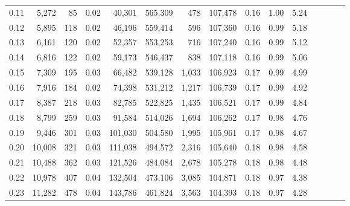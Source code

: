 \begin{tabular}{rrrcrrrrrrrrrrr}
0.11 &   5,272 &     85 &                                       0.02 &   40,301 &  565,309 &      478 &  107,478 &  0.16 &  1.00 &                         5.24 \\
0.12 &   5,895 &    118 &                                       0.02 &   46,196 &  559,414 &      596 &  107,360 &  0.16 &  0.99 &                         5.18 \\
0.13 &   6,161 &    120 &                                       0.02 &   52,357 &  553,253 &      716 &  107,240 &  0.16 &  0.99 &                         5.12 \\
0.14 &   6,816 &    122 &                                       0.02 &   59,173 &  546,437 &      838 &  107,118 &  0.16 &  0.99 &                         5.06 \\
0.15 &   7,309 &    195 &                                       0.03 &   66,482 &  539,128 &    1,033 &  106,923 &  0.17 &  0.99 &                         4.99 \\
0.16 &   7,916 &    184 &                                       0.02 &   74,398 &  531,212 &    1,217 &  106,739 &  0.17 &  0.99 &                         4.92 \\
0.17 &   8,387 &    218 &                                       0.03 &   82,785 &  522,825 &    1,435 &  106,521 &  0.17 &  0.99 &                         4.84 \\
0.18 &   8,799 &    259 &                                       0.03 &   91,584 &  514,026 &    1,694 &  106,262 &  0.17 &  0.98 &                         4.76 \\
0.19 &   9,446 &    301 &                                       0.03 &  101,030 &  504,580 &    1,995 &  105,961 &  0.17 &  0.98 &                         4.67 \\
0.20 &  10,008 &    321 &                                       0.03 &  111,038 &  494,572 &    2,316 &  105,640 &  0.18 &  0.98 &                         4.58 \\
0.21 &  10,488 &    362 &                                       0.03 &  121,526 &  484,084 &    2,678 &  105,278 &  0.18 &  0.98 &                         4.48 \\
0.22 &  10,978 &    407 &                                       0.04 &  132,504 &  473,106 &    3,085 &  104,871 &  0.18 &  0.97 &                         4.38 \\
0.23 &  11,282 &    478 &                                       0.04 &  143,786 &  461,824 &    3,563 &  104,393 &  0.18 &  0.97 &                         4.28 \\

\end{tabular}
